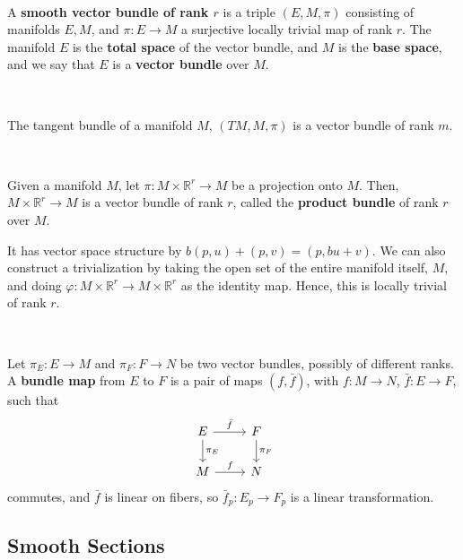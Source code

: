\documentclass{article}
\begin{document}
\begin{definition}
  \

  A \textbf{smooth vector bundle of rank $r$} is a triple $(E, M, \pi)$ consisting of manifolds $E, M$, and $\pi: E \to M$ a surjective locally trivial map of rank $r$. The manifold $E$ is the \textbf{total space} of the vector bundle, and $M$ is the \textbf{base space}, and we say that $E$ is a \textbf{vector bundle} over $M$.
\end{definition}

\begin{example}
  \

  The tangent bundle of a manifold $M$, $(TM, M, \pi)$ is a vector bundle of rank $m$.
\end{example}

\begin{example}
  \

  Given a manifold $M$, let $\pi: M \times \mathbb{R}^r \to M$ be a projection onto $M$. Then, $M \times \mathbb{R}^r \to M$ is a vector bundle of rank $r$, called the \textbf{product bundle} of rank $r$ over $M$.

  It has vector space structure by $b(p, u) + (p,v) = (p, bu+v)$. We can also construct a trivialization by taking the open set of the entire manifold itself, $M$, and doing $\varphi: M \times \mathbb{R}^r \to M \times \mathbb{R}^r$ as the identity map. Hence, this is locally trivial of rank $r$.
\end{example}

\begin{definition}
  \

  Let $\pi_E: E \to M$ and $\pi_F: F \to N$ be two vector bundles, possibly of different ranks. A \textbf{bundle map} from $E$ to $F$ is a pair of maps $(f, \bar{f})$, with $f: M \to N$, $\bar{f}: E \to F$, such that \[
    \begin{tikzcd}
      E & F\\
      M & N
      \arrow[from=1-1,to=1-2, "\bar{f}"]
      \arrow[from=1-1, to=2-1, "\pi_E"]
      \arrow[from=1-2, to=2-2, "\pi_F"]
      \arrow[from=2-1, to=2-2, "f"]
  \end{tikzcd}\]commutes, and $\bar{f}$ is linear on fibers, so $\bar{f}_p: E_p \to F_p$ is a linear transformation.
\end{definition}

\subsection{Smooth Sections}
\
\end{document}
